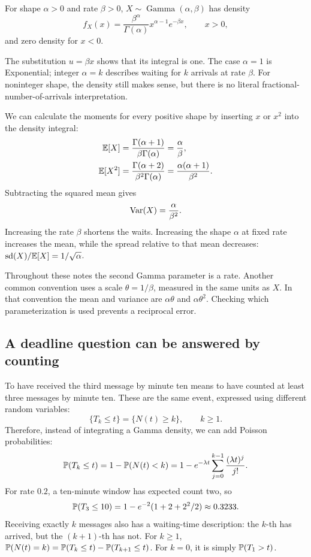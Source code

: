 \begin{definition}
For shape \(\alpha>0\) and rate \(\beta>0\),
\(X\sim\operatorname{Gamma}(\alpha,\beta)\) has density
\[
  f_X(x)=\frac{\beta^\alpha}{\Gamma(\alpha)}
      x^{\alpha-1}e^{-\beta x},\qquad x>0,
\]
and zero density for \(x<0\).
\end{definition}

The substitution \(u=\beta x\) shows that its integral is one.
The case \(\alpha=1\) is Exponential; integer \(\alpha=k\) describes
waiting for \(k\) arrivals at rate \(\beta\).
For noninteger shape, the density still makes sense, but there is no
literal fractional-number-of-arrivals interpretation.

We can calculate the moments for every positive shape by inserting
\(x\) or \(x^2\) into the density integral:
\begin{align*}
  \mathbb{E}[X]
    &=\frac{\Gamma(\alpha+1)}{\beta\Gamma(\alpha)}
      =\frac{\alpha}{\beta},\\
  \mathbb{E}[X^2]
    &=\frac{\Gamma(\alpha+2)}{\beta^2\Gamma(\alpha)}
      =\frac{\alpha(\alpha+1)}{\beta^2}.
\end{align*}
Subtracting the squared mean gives
\[
  \operatorname{Var}(X)=\frac{\alpha}{\beta^2}.
\]
Increasing the rate \(\beta\) shortens the waits.
Increasing the shape \(\alpha\) at fixed rate increases the mean, while
the spread relative to that mean decreases:
\(\operatorname{sd}(X)/\mathbb{E}[X]=1/\sqrt{\alpha}\).

Throughout these notes the second Gamma parameter is a rate.
Another common convention uses a scale \(\theta=1/\beta\), measured in
the same units as \(X\). In that convention the mean and variance are
\(\alpha\theta\) and \(\alpha\theta^2\). Checking which parameterization
is used prevents a reciprocal error.

\subsection{A deadline question can be answered by counting}

To have received the third message by minute ten means to have counted
at least three messages by minute ten. These are the same event,
expressed using different random variables:
\begin{equation}
  \{T_k\le t\}=\{N(t)\ge k\},\qquad k\ge1.
  \label{eq:arrivals-counts}
\end{equation}
Therefore, instead of integrating a Gamma density, we can add Poisson
probabilities:
\[
  \mathbb{P}(T_k\le t)
  =1-\mathbb{P}(N(t)<k)
  =1-e^{-\lambda t}\sum_{j=0}^{k-1}\frac{(\lambda t)^j}{j!}.
\]
For rate \(0.2\), a ten-minute window has expected count two, so
\[
  \mathbb{P}(T_3\le10)
  =1-e^{-2}(1+2+2^2/2)\approx0.3233.
\]
Receiving exactly \(k\) messages also has a waiting-time description:
the \(k\)-th has arrived, but the \((k+1)\)-th has not.
For \(k\ge1\),
\(\mathbb{P}(N(t)=k)=\mathbb{P}(T_k\le t)-\mathbb{P}(T_{k+1}\le t)\).
For \(k=0\), it is simply \(\mathbb{P}(T_1>t)\).

